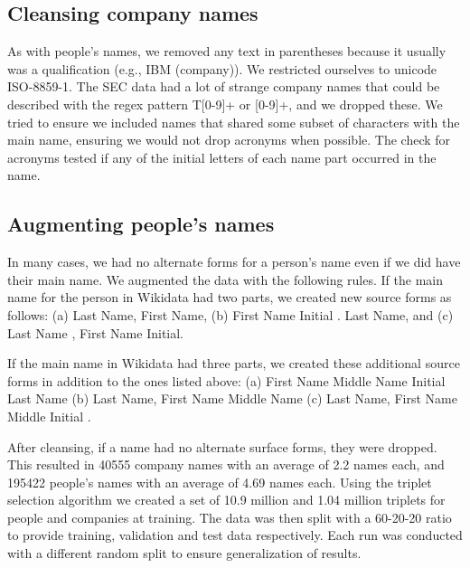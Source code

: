 \subsection{Cleansing company names}
As with people's names, we removed any text in parentheses because it usually was a qualification (e.g., IBM (company)).  We restricted ourselves to unicode ISO-8859-1.  The SEC data had a lot of strange company names that could be described with the regex pattern T[0-9]+ or [0-9]+, and we dropped these.  We tried to ensure we included names that shared some subset of characters with the main name, ensuring we would not drop acronyms when possible.  The check for acronyms tested if any of the initial letters of each name part occurred in the name.

\subsection{Augmenting people's names}
In many cases, we had no alternate forms for a person's name even if we did have their main name.  We augmented the data with the following rules.  If the main name for the person in Wikidata had two parts, we created new source forms as follows: (a) Last Name, First Name, (b) First Name Initial . Last Name, and (c) Last Name , First Name Initial.

If the main name in Wikidata had three parts, we created these additional source forms in addition to the ones listed above: (a) First Name Middle Name Initial Last Name (b) Last Name, First Name Middle Name (c) Last Name, First Name Middle Initial .

After cleansing, if a name had no alternate surface forms, they were dropped.  This resulted in 40555 company names with an average of 2.2 names each, and 195422 people's names with an average of 4.69 names each.  Using the triplet selection algorithm we created a set of 10.9 million and 1.04 million triplets for people and companies at training.  The data was then split with a 60-20-20 ratio to provide training, validation and test data respectively.  Each run was conducted with a different random split to ensure generalization of results.

